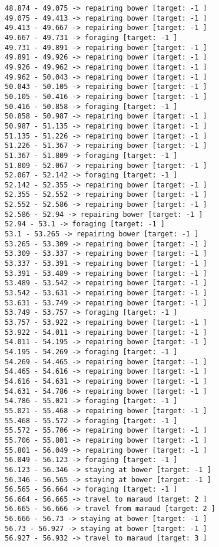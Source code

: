 \documentclass[11pt]{article}
\begin{document}
\begin{Verbatim}[commandchars=\\\{\}]
48.874 - 49.075 -> repairing bower [target: -1 ]
49.075 - 49.413 -> repairing bower [target: -1 ]
49.413 - 49.667 -> repairing bower [target: -1 ]
49.667 - 49.731 -> foraging [target: -1 ]
49.731 - 49.891 -> repairing bower [target: -1 ]
49.891 - 49.926 -> repairing bower [target: -1 ]
49.926 - 49.962 -> repairing bower [target: -1 ]
49.962 - 50.043 -> repairing bower [target: -1 ]
50.043 - 50.105 -> repairing bower [target: -1 ]
50.105 - 50.416 -> repairing bower [target: -1 ]
50.416 - 50.858 -> foraging [target: -1 ]
50.858 - 50.987 -> repairing bower [target: -1 ]
50.987 - 51.135 -> repairing bower [target: -1 ]
51.135 - 51.226 -> repairing bower [target: -1 ]
51.226 - 51.367 -> repairing bower [target: -1 ]
51.367 - 51.809 -> foraging [target: -1 ]
51.809 - 52.067 -> repairing bower [target: -1 ]
52.067 - 52.142 -> foraging [target: -1 ]
52.142 - 52.355 -> repairing bower [target: -1 ]
52.355 - 52.552 -> repairing bower [target: -1 ]
52.552 - 52.586 -> repairing bower [target: -1 ]
52.586 - 52.94 -> repairing bower [target: -1 ]
52.94 - 53.1 -> foraging [target: -1 ]
53.1 - 53.265 -> repairing bower [target: -1 ]
53.265 - 53.309 -> repairing bower [target: -1 ]
53.309 - 53.337 -> repairing bower [target: -1 ]
53.337 - 53.391 -> repairing bower [target: -1 ]
53.391 - 53.489 -> repairing bower [target: -1 ]
53.489 - 53.542 -> repairing bower [target: -1 ]
53.542 - 53.631 -> repairing bower [target: -1 ]
53.631 - 53.749 -> repairing bower [target: -1 ]
53.749 - 53.757 -> foraging [target: -1 ]
53.757 - 53.922 -> repairing bower [target: -1 ]
53.922 - 54.011 -> repairing bower [target: -1 ]
54.011 - 54.195 -> repairing bower [target: -1 ]
54.195 - 54.269 -> foraging [target: -1 ]
54.269 - 54.465 -> repairing bower [target: -1 ]
54.465 - 54.616 -> repairing bower [target: -1 ]
54.616 - 54.631 -> repairing bower [target: -1 ]
54.631 - 54.786 -> repairing bower [target: -1 ]
54.786 - 55.021 -> foraging [target: -1 ]
55.021 - 55.468 -> repairing bower [target: -1 ]
55.468 - 55.572 -> foraging [target: -1 ]
55.572 - 55.706 -> repairing bower [target: -1 ]
55.706 - 55.801 -> repairing bower [target: -1 ]
55.801 - 56.049 -> repairing bower [target: -1 ]
56.049 - 56.123 -> foraging [target: -1 ]
56.123 - 56.346 -> staying at bower [target: -1 ]
56.346 - 56.565 -> staying at bower [target: -1 ]
56.565 - 56.664 -> foraging [target: -1 ]
56.664 - 56.665 -> travel to maraud [target: 2 ]
56.665 - 56.666 -> travel from maraud [target: 2 ]
56.666 - 56.73 -> staying at bower [target: -1 ]
56.73 - 56.927 -> staying at bower [target: -1 ]
56.927 - 56.932 -> travel to maraud [target: 3 ]

\end{Verbatim}
\end{document}

